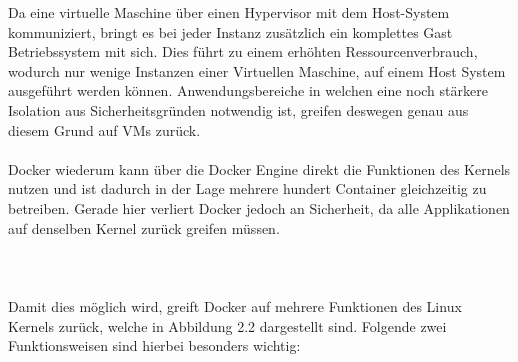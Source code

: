 \documentclass[12pt,toc=bib,toc=listof]{scrreprt}
\begin{document}
Da eine virtuelle Maschine über einen Hypervisor mit dem Host-System kommuniziert, bringt es bei jeder Instanz zusätzlich ein komplettes Gast Betriebssystem mit sich.
Dies führt zu einem erhöhten Ressourcenverbrauch, wodurch nur wenige Instanzen einer Virtuellen Maschine, auf einem Host System ausgeführt werden können.
Anwendungsbereiche in welchen eine noch stärkere Isolation aus Sicherheitsgründen notwendig ist, greifen deswegen genau aus diesem Grund auf VMs zurück.\\
\\
Docker wiederum kann über die Docker Engine direkt die Funktionen des Kernels nutzen und ist dadurch in der Lage mehrere hundert Container gleichzeitig zu betreiben.
Gerade hier verliert Docker jedoch an Sicherheit, da alle Applikationen auf denselben Kernel zurück greifen müssen.\\
\\
\\
\\
Damit dies möglich wird, greift Docker auf mehrere Funktionen des Linux Kernels zurück, welche in Abbildung 2.2 dargestellt sind.
Folgende zwei Funktionsweisen sind hierbei besonders wichtig:
\end{document}

